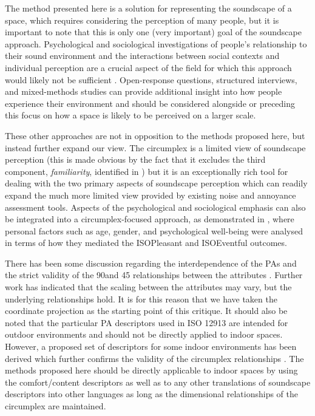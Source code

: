 \documentclass[
  authoryear,
  preprint,
  3p]{elsarticle}
\begin{document}
The method presented here is a solution for representing the soundscape
of a space, which requires considering the perception of many people,
but it is important to note that this is only one (very important) goal
of the soundscape approach. Psychological and sociological
investigations of people's relationship to their sound environment and
the interactions between social contexts and individual perception are a
crucial aspect of the field for which this approach would likely not be
sufficient \citep{Bild2018Public}. Open-response questions, structured
interviews, and mixed-methods studies can provide additional insight
into how people experience their environment and should be considered
alongside or preceding this focus on how a space is likely to be
perceived on a larger scale.

These other approaches are not in opposition to the methods proposed
here, but instead further expand our view. The circumplex is a limited
view of soundscape perception (this is made obvious by the fact that it
excludes the third component, \emph{familiarity}, identified in
\citet{Axelsson2010Principal}) but it is an exceptionally rich tool for
dealing with the two primary aspects of soundscape perception which can
readily expand the much more limited view provided by existing noise and
annoyance assessment tools. Aspects of the psychological and
sociological emphasis can also be integrated into a circumplex-focused
approach, as demonstrated in \citet{Erfanian2021Psychological}, where
personal factors such as age, gender, and psychological well-being were
analysed in terms of how they mediated the ISOPleasant and ISOEventful
outcomes.

There has been some discussion regarding the interdependence of the PAs
and the strict validity of the 90\degree and 45 \degree relationships
between the attributes \citep{Lionello2021Introducing}. Further work has
indicated that the scaling between the attributes may vary, but the
underlying relationships hold. It is for this reason that we have taken
the coordinate projection as the starting point of this critique. It
should also be noted that the particular PA descriptors used in ISO
12913 are intended for outdoor environments and should not be directly
applied to indoor spaces. However, a proposed set of descriptors for
some indoor environments has been derived which further confirms the
validity of the circumplex relationships \citep{Torresin2020Indoor}. The
methods proposed here should be directly applicable to indoor spaces by
using the comfort/content descriptors as well as to any other
translations of soundscape descriptors into other languages
\citep{Aletta2020Soundscape} as long as the dimensional relationships of
the circumplex are maintained.
\end{document}
